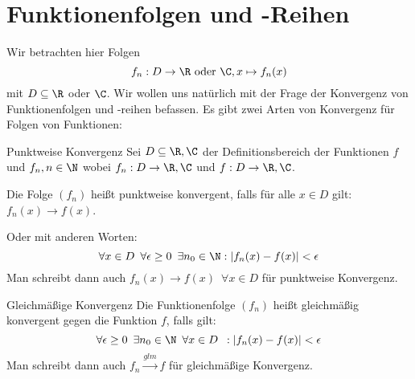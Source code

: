 \chapter{Funktionenfolgen und -Reihen}
Wir betrachten hier Folgen
\begin{equation*}
	f_n:D\rightarrow \R \text{ oder } \C, x\mapsto f_n(x)
\end{equation*}
mit $D\subseteq \R$ oder $\C$. Wir wollen uns natürlich mit der Frage der Konvergenz von Funktionenfolgen und -reihen befassen. Es gibt zwei Arten von Konvergenz für Folgen von Funktionen:

\begin{definition}{Punktweise Konvergenz}
	Sei $D\subseteq \R,\C$ der Definitionsbereich der Funktionen $f$ und $f_n, n\in\N$ wobei $f_n:D\rightarrow \R,\C$ und $f:D\rightarrow \R,\C$.

	Die Folge $(f_n)$ heißt punktweise konvergent, falls für alle $x\in D$ gilt: $f_n(x)\to f(x)$.

	Oder mit anderen Worten:
	\begin{equation*}
		\forall x\in D\enspace \forall \epsilon\geq0 \enspace\exists n_0\in\N : |f_n(x)-f(x)|<\epsilon
	\end{equation*}
	Man schreibt dann auch $f_n(x)\to f(x)\enspace \forall x\in D$ für punktweise Konvergenz.
\end{definition}
\begin{definition}{Gleichmäßige Konvergenz}
	Die Funktionenfolge $(f_n)$ heißt gleichmäßig konvergent gegen die Funktion $f$, falls gilt:
	\begin{equation*}
		\forall\epsilon\geq0\enspace\exists n_0\in\N\enspace\forall x\in D\enspace   : |f_n(x)-f(x)|<\epsilon
	\end{equation*}
	Man schreibt dann auch $f_n\overset{glm}\longrightarrow f$ für gleichmäßige Konvergenz.
\end{definition}


